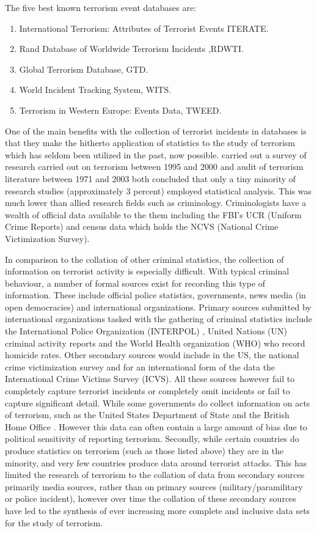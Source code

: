 The five best known terrorism event databases are:
\begin{enumerate}
\item  International Terrorism: Attributes of Terrorist Events ITERATE.
\item Rand Database of Worldwide Terrorism Incidents ,RDWTI.
\item Global Terrorism Database, GTD.
\item World Incident Tracking System, WITS.
\item Terrorism in Western Europe: Events Data, TWEED.
\end{enumerate}

One of the main benefits with the collection of terrorist incidents in databases is that they make the hitherto application of statistics to the study of terrorism which has seldom been utilized in the past, now possible. \citep{silke2001devil} carried out a survey of research carried out on terrorism between 1995 and 2000 and \citep{lum2006counter} audit of terrorism literature between 1971 and 2003 both concluded that only a tiny minority of research studies (approximately 3 percent) employed statistical analysis. This was much lower than allied research fields such as criminology. Criminologists have a wealth of official data available to the them including the FBI's UCR (Uniform Crime Reports) and census data which holds the NCVS (National Crime Victimization Survey).

In comparison to the collation of other criminal statistics, the collection of information on terrorist activity is especially difficult. With typical criminal behaviour, a number of formal sources exist for recording this type of information. These include official police statistics, governments, news media (in open democracies) and  international organizations. Primary sources submitted by international organizations tasked with the gathering of criminal statistics include the International Police Organization (INTERPOL) \citep{bresler1992interpol}, United Nations (UN) criminal activity reports \citep{united2013global} and the World Health organization (WHO) who record homicide rates. Other secondary sources would include in the US, the national crime victimization survey and for an international form of the data the International Crime Victims Survey (ICVS). All these sources however fail to completely capture terrorist incidents or completely omit incidents or fail to capture significant detail. While some governments do collect information on acts of terrorism, such as the United States Department of State and the British Home Office \citep{Homeoffice2016}. However this data can often contain a large amount of bias due to political sensitivity of reporting terrorism. Secondly, while certain countries do produce statistics on terrorism (such as those listed above) they are in the minority, and very few countries produce data around terrorist attacks. This has limited the research of terrorism to the collation of data from secondary sources primarily media sources, rather than on primary sources (military/paramilitary or police incident), however over time the collation of these secondary sources have led to the synthesis of ever increasing more complete and inclusive data sets for the study of terrorism.

